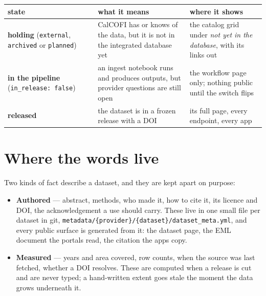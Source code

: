 \documentclass[
  letterpaper,
  DIV=11,
  numbers=noendperiod]{scrreprt}
\providecommand{\tightlist}{%
  \setlength{\itemsep}{0pt}\setlength{\parskip}{0pt}}
\begin{document}
\begin{longtable}[]{@{}
  >{\raggedright\arraybackslash}p{}
  >{\raggedright\arraybackslash}p{}
  >{\raggedright\arraybackslash}p{}@{}}
\toprule\noalign{}
\begin{minipage}[b]{\linewidth}\raggedright
state
\end{minipage} & \begin{minipage}[b]{\linewidth}\raggedright
what it means
\end{minipage} & \begin{minipage}[b]{\linewidth}\raggedright
where it shows
\end{minipage} \\
\midrule\noalign{}
\endhead
\bottomrule\noalign{}
\endlastfoot
\textbf{holding} (\texttt{external}, \texttt{archived} or
\texttt{planned}) & CalCOFI has or knows of the data, but it is not in
the integrated database yet & the catalog grid under \emph{not yet in
the database}, with its links out \\
\textbf{in the pipeline} (\texttt{in\_release:\ false}) & an ingest
notebook runs and produces outputs, but provider questions are still
open & the workflow page only; nothing public until the switch flips \\
\textbf{released} & the dataset is in a frozen release with a DOI & its
full page, every endpoint, every app \\
\end{longtable}

\section{Where the words live}\label{where-the-words-live}

Two kinds of fact describe a dataset, and they are kept apart on
purpose:

\begin{itemize}
\tightlist
\item
  \textbf{Authored} --- abstract, methods, who made it, how to cite it,
  its licence and DOI, the acknowledgement a use should carry. These
  live in one small file per dataset in git,
  \texttt{metadata/\{provider\}/\{dataset\}/dataset\_meta.yml}, and
  every public surface is generated from it: the dataset page, the EML
  document the portals read, the citation the apps copy.
\item
  \textbf{Measured} --- years and area covered, row counts, when the
  source was last fetched, whether a DOI resolves. These are computed
  when a release is cut and are never typed; a hand-written extent goes
  stale the moment the data grows underneath it.
\end{itemize}
\end{document}
